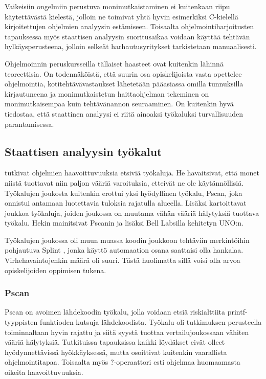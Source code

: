Vaikeisiin ongelmiin perustuva monimutkaistaminen ei kuitenkaan riipu
käytettävästä kielestä, jolloin ne toimivat yhtä hyvin esimerkiksi 
C-kielellä kirjoitettujen ohjelmien analyysin estämiseen. Toisaalta 
ohjelmointiharjoitusten tapauksessa myös staattisen analyysin suoritusaikaa
voidaan käyttää tehtävän hylkäysperusteena, jolloin selkeät harhautusyritykset
tarkistetaan manuaalisesti.

Ohjelmoinnin peruskursseilla tällaiset haasteet ovat kuitenkin lähinnä
teoreettisia. On todennäköistä, että suurin osa opiskelijoista vasta opettelee
ohjelmointia, kotitehtävävastaukset lähetetään pääasiassa omilla tunnuksilla
kirjautuneena ja monimutkaistetun haittaohjelman tekeminen on monimutkaisempaa
kuin tehtävänannon seuraaminen. On kuitenkin hyvä tiedostaa, että staattinen
analyysi ei riitä ainoaksi työkaluksi turvallisuuden parantamisessa.

\subsection{Staattisen analyysin työkalut}

\citet{heffley2004can} tutkivat ohjelmien haavoittuvuuksia etsiviä työkaluja.
He havaitsivat, että monet niistä tuottavat niin paljon vääriä varoituksia,
etteivät ne ole käytännöllisiä. Työkalujen joukosta kuitenkin erottui yksi
hyödyllinen työkalu, Pscan, joka onnistui antamaan luotettavia tuloksia
rajatulla alueella. Lisäksi \citet{tevis2004methods} kartoittavat joukkoa
työkaluja, joiden joukossa on muutama vähän vääriä hälytyksiä tuottava työkalu.
Hekin mainitsivat Pscanin ja lisäksi Bell Labsilla kehitetyn UNO:n.

Työkalujen joukossa oli muun muassa koodin joukkoon tehtäviin merkintöihin
pohjautuva Splint \citep{tevis2004methods}, jonka käyttö automaation osana
saattaisi olla hankalaa. Virhehavaintojenkin määrä oli suuri. Tästä huolimatta
sillä voisi olla arvoa opiskelijoiden oppimisen tukena.

\subsubsection{Pscan}

Pscan on avoimen lähdekoodin työkalu, jolla voidaan etsiä riskialttiita
printf-tyyppisten funktioden kutsuja lähdekoodista.
Työkalu oli \citet{heffley2004can} tutkimuksen perusteella
toiminnaltaan hyvin rajattu ja siitä syystä tuottaa vertailujoukossaan vähiten
vääriä hälytyksiä. Tutkituissa tapauksissa kaikki löydäkset eivät olleet
hyödynnettävissä hyökkäyksessä, mutta osoittivat kuitenkin vaarallista
ohjelmointitapaa. Toisaalta myös ?-operaattori esti ohjelmaa huomaamasta
oikeita haavoittuvuuksia.

